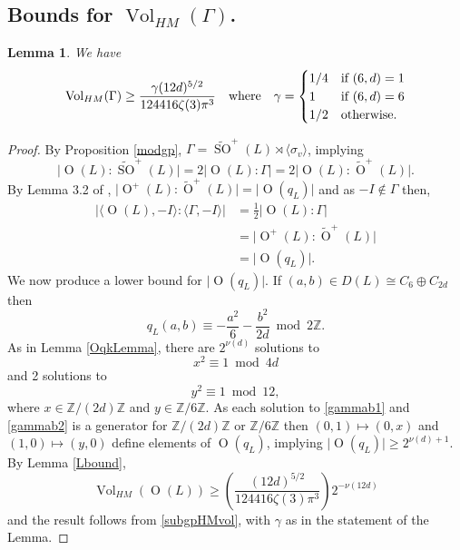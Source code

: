 \documentclass[12pt, a4paper]{article}
\newtheorem{lemma}[thm]{Lemma}
\newcommand{\ZZ}{\mathbb{Z}}
\newcommand{\la}{\langle}
\newcommand{\ra}{\rangle}
\newcommand{\opn}{\operatorname}
\newcommand{\op}{\oplus}
\begin{document}
\subsection{Bounds for $\opn{Vol}_{HM}(\Gamma)$.}
\begin{lemma}\label{GammaBound}
We have 
\begin{equation*}
      \begin{array}{c c c}
        \opn{Vol}_{HM}(\Gamma) \geq  \dfrac{\gamma(12d)^{5/2} }{ 124416 \zeta(3) \pi^3 }
        & \text{where} &
        \gamma =
        \begin{cases}
          1/4 & \text{if $(6,d)=1$} \\
          1 & \text{if $(6,d)=6$} \\
          1/2 & \text{otherwise.}
        \end{cases}
        \end{array}
    \end{equation*}
\end{lemma}
  \begin{proof}
    By Proposition \ref{modgp}, $\Gamma = \widetilde{\opn{SO}}^+(L) \rtimes \la \sigma_v \ra$, implying 
    \[
    \vert \opn{O}(L) : \widetilde{\opn{SO}}^+(L) \vert  
    = 
    2 \vert \opn{O}(L) : \Gamma \vert
    =
    2 \vert \opn{O}(L) : \widetilde{\opn{O}}^+(L) \vert.
    \]
    By Lemma 3.2 of \cite{HMvolapps},
    $\vert \opn{O}^+(L) : \widetilde{\opn{O}}^+(L) \vert
    =
    \vert \opn{O}(q_L ) \vert
    $
    and as $ -I \not \in \Gamma$ then,
    \begin{align*}
      \vert \la \opn{O}(L), -I \ra : \la \Gamma, -I \ra \vert
      &=
      \frac{1}{2} \vert \opn{O}(L) : \Gamma \vert \\
      &=
      \vert \opn{O}^+(L) : \widetilde{\opn{O}}^+(L) \vert \\
      & = \vert \opn{O}(q_L) \vert.
    \end{align*}
    We now produce a lower bound for $\vert \opn{O}(q_L) \vert$.
    If $(a,b) \in D(L) \cong C_6 \op C_{2d}$ then
    \[
    q_L(a,b) \equiv
     -\frac{a^2}{6} -  \frac{b^2}{2d}  \bmod{ 2\ZZ}.
     \]
     As in Lemma \ref{OqkLemma}, there are $2^{\nu(d)}$ solutions to
     \begin{equation}\label{gammab1}
       x^2 \equiv 1 \bmod{ 4d}
     \end{equation}
      and  2 solutions to
    \begin{equation}\label{gammab2}
      y^2 \equiv 1 \bmod{ 12}, 
    \end{equation}
    where $x \in \ZZ / (2d) \ZZ$ and $y \in \ZZ / 6 \ZZ$.
    As each solution to \eqref{gammab1} and \eqref{gammab2} is a generator for $\ZZ/(2d) \ZZ$ or $\ZZ/6 \ZZ$ then
    $(0,1) \mapsto (0,x)$
    and
    $(1,0) \mapsto (y,0)$
    define elements of $\opn{O}(q_L)$, implying  $\vert \opn{O}(q_L) \vert \geq 2^{\nu(d) + 1}$.
    By Lemma \ref{Lbound}, 
    \begin{equation*}
      \opn{Vol}_{HM}(\opn{O}(L)) \geq
      \left (
      \frac{(12d)^{5/2}}{124416 \zeta(3) \pi^3}
      \right )
      2^{-\nu(12d)} 
    \end{equation*}
    and the result follows from \eqref{subgpHMvol}, with $\gamma$  as in the statement of the Lemma.
\end{proof}
\end{document}
